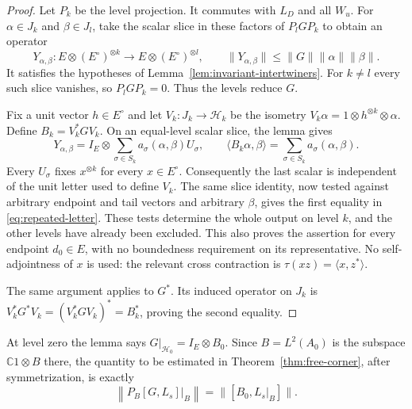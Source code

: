 \begin{proof}
Let $P_k$ be the level projection.  It commutes with $L_D$ and all
$W_u$.  For $\alpha\in J_k$ and $\beta\in J_l$, take the scalar
slice in these factors of $P_lGP_k$ to obtain an operator
\[
 Y_{\alpha,\beta}:
 E\otimes(E^\circ)^{\otimes k}
   \longrightarrow E\otimes(E^\circ)^{\otimes l},
 \qquad
 \|Y_{\alpha,\beta}\|\leq\|G\|\|\alpha\|\|\beta\|.
\]
It satisfies the hypotheses of
Lemma~\ref{lem:invariant-intertwiners}.  For $k\ne l$ every such
slice vanishes, so $P_lGP_k=0$.  Thus the levels reduce $G$.

Fix a unit vector $h\in E^\circ$ and let
$V_k:J_k\to\mathcal H_k$ be the isometry
$V_k\alpha=1\otimes h^{\otimes k}\otimes\alpha$.
Define $B_k=V_k^*GV_k$.  On an equal-level scalar slice, the lemma
gives
\[
 Y_{\alpha,\beta}
    =I_E\otimes\sum_{\sigma\in S_k}
                        a_\sigma(\alpha,\beta)U_\sigma,
 \qquad
 \langle B_k\alpha,\beta\rangle
       =\sum_{\sigma\in S_k}a_\sigma(\alpha,\beta).
\]
Every $U_\sigma$ fixes $x^{\otimes k}$ for every $x\in E^\circ$.
Consequently the last scalar is independent of the unit letter
used to define $V_k$.  The same slice identity, now tested against
arbitrary endpoint and tail vectors and arbitrary $\beta$, gives
the first equality in \eqref{eq:repeated-letter}.  These tests
determine the whole output on level $k$, and the other levels have
already been excluded.  This also proves the assertion for every
endpoint $d_0\in E$, with no boundedness requirement on its
representative.  No self-adjointness of $x$ is used: the relevant
cross contraction is $\tau(xz)=\langle x,z^*\rangle$.

The same argument applies to $G^*$.  Its induced operator on $J_k$
is $V_k^*G^*V_k=(V_k^*GV_k)^*=B_k^*$, proving the second equality.
\end{proof}

At level zero the lemma says $G|_{\mathcal H_0}=I_E\otimes B_0$.
Since $B=L^2(A_0)$ is the subspace $\mathbb C1\otimes B$ there,
the quantity to be estimated in
Theorem~\ref{thm:free-corner}, after symmetrization, is exactly
\[
 \left\|P_B[G,L_s]\big|_B\right\|
      =\|[B_0,L_s|_B]\|.
\]
